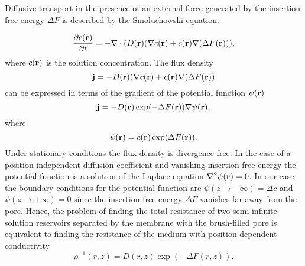 \documentclass[12pt, a4paper]{article}
\begin{document}

Diffusive transport in the presence of an external force generated by the insertion free energy $\Delta F$ is described by the Smoluchowski equation.

\begin{equation}
    \frac{\partial c(\bold r)}{\partial t}=-{\bold \nabla}\cdot (D(\bold r)({\bold \nabla}c({\bold r})+c({\bold r}){\bold \nabla}(\Delta F({\bold  r}))),
    \label{eq:Smoluch}
\end{equation}
where $c(\bold r)$ is the solution concentration. The flux density 
\begin{equation}
    \bold j=- D(\bold r)({\bold \nabla}c({\bold r})+c({\bold r}){\bold \nabla}(\Delta F({\bold  r}))
    \label{eq:j}
\end{equation}
can be expressed in terms of the gradient of the potential function $\psi(\bold r)$
\begin{equation}
    \bold j=- D(\bold r) \exp(-\Delta F({\bold  r}))  {\bold \nabla} \psi(\bold r),
    \label{eq:psi}
\end{equation}
where
\begin{equation}
    \psi(\bold r)=c(\bold r)\exp(\Delta F(\bold r)).
    \label{eq:psi1}
\end{equation}
Under stationary conditions the flux density is divergence free. In the case of a position-independent diffusion coefficient and vanishing insertion free energy the potential function is a solution of the Laplace equation $\nabla^2 \psi(\bold r)=0$.
In our case the boundary conditions for the potential function are $\psi(z\rightarrow -\infty)=\Delta c$ and $\psi(z\rightarrow +\infty)=0$ since the insertion free energy $\Delta F$ vanishes far away from the pore.
Hence, the problem of finding the total resistance of two semi-infinite solution reservoirs separated by the membrane with the brush-filled pore is equivalent to finding the resistance of the medium with position-dependent conductivity 
\begin{equation}
    \rho^{-1} (r,z)= D(r,z)\exp(-\Delta F(r,z)).
    \label{eq:rho}
\end{equation}

\end{document}
